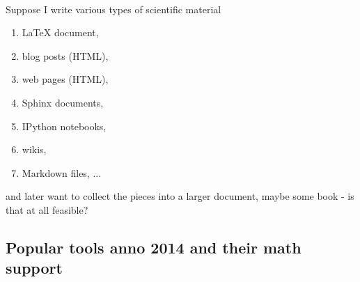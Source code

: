 \documentclass[%
twoside,                 %
final,                   %
10pt]{article}
\begin{document}
\paragraph{}
Suppose I write various types of scientific material
\begin{enumerate}
\item {\LaTeX} document,

\item blog posts (HTML),

\item web pages (HTML),

\item Sphinx documents,

\item IPython notebooks,

\item wikis,

\item Markdown files, ...
\end{enumerate}

\noindent
and later want to collect the pieces into a larger document, maybe some book - is that at all feasible?




\subsection{Popular tools anno 2014 and their math support}

\end{document}
